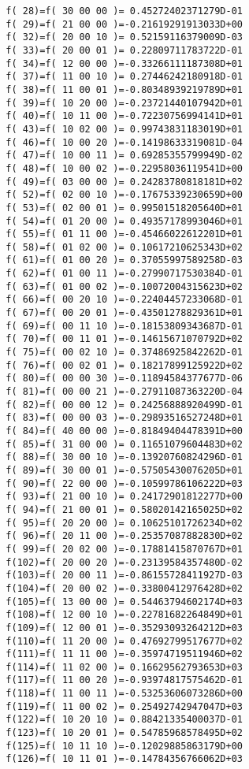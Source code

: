 {\begin{verbatim}
  f( 28)=f( 30 00 00 )= 0.45272402371279D-01
  f( 29)=f( 21 00 00 )=-0.21619291913033D+00
  f( 32)=f( 20 00 10 )= 0.52159116379009D-03
  f( 33)=f( 20 00 01 )= 0.22809711783722D-01
  f( 34)=f( 12 00 00 )=-0.33266111187308D+01
  f( 37)=f( 11 00 10 )= 0.27446242180918D-01
  f( 38)=f( 11 00 01 )=-0.80348939219789D+01
  f( 39)=f( 10 20 00 )=-0.23721440107942D+01
  f( 40)=f( 10 11 00 )=-0.72230756994141D+01
  f( 43)=f( 10 02 00 )= 0.99743831183019D+01
  f( 46)=f( 10 00 20 )=-0.14198633319081D-04
  f( 47)=f( 10 00 11 )= 0.69285355799949D-02
  f( 48)=f( 10 00 02 )=-0.22958036119541D+00
  f( 49)=f( 03 00 00 )= 0.24283780818181D+02
  f( 52)=f( 02 00 10 )=-0.17675339230659D+00
  f( 53)=f( 02 00 01 )= 0.99501518205640D+01
  f( 54)=f( 01 20 00 )= 0.49357178993046D+01
  f( 55)=f( 01 11 00 )=-0.45466022612201D+01
  f( 58)=f( 01 02 00 )= 0.10617210625343D+02
  f( 61)=f( 01 00 20 )= 0.37055997589258D-03
  f( 62)=f( 01 00 11 )=-0.27990717530384D-01
  f( 63)=f( 01 00 02 )=-0.10072004315623D+02
  f( 66)=f( 00 20 10 )=-0.22404457233068D-01
  f( 67)=f( 00 20 01 )=-0.43501278829361D+01
  f( 69)=f( 00 11 10 )=-0.18153809343687D-01
  f( 70)=f( 00 11 01 )=-0.14615671070792D+02
  f( 75)=f( 00 02 10 )= 0.37486925842262D-01
  f( 76)=f( 00 02 01 )= 0.18217899125922D+02
  f( 80)=f( 00 00 30 )=-0.11894584377677D-06
  f( 81)=f( 00 00 21 )=-0.27911087363220D-04
  f( 82)=f( 00 00 12 )= 0.24256888920499D-01
  f( 83)=f( 00 00 03 )=-0.29893516527248D+01
  f( 84)=f( 40 00 00 )=-0.81849404478391D+00
  f( 85)=f( 31 00 00 )= 0.11651079604483D+02
  f( 88)=f( 30 00 10 )=-0.13920760824296D-01
  f( 89)=f( 30 00 01 )=-0.57505430076205D+01
  f( 90)=f( 22 00 00 )=-0.10599786106222D+03
  f( 93)=f( 21 00 10 )= 0.24172901812277D+00
  f( 94)=f( 21 00 01 )= 0.58020142165025D+02
  f( 95)=f( 20 20 00 )= 0.10625101726234D+02
  f( 96)=f( 20 11 00 )=-0.25357087882830D+02
  f( 99)=f( 20 02 00 )=-0.17881415870767D+01
  f(102)=f( 20 00 20 )=-0.23139584357480D-02
  f(103)=f( 20 00 11 )=-0.86155728411927D-03
  f(104)=f( 20 00 02 )=-0.33800412976428D+02
  f(105)=f( 13 00 00 )= 0.54463794602174D+03
  f(108)=f( 12 00 10 )=-0.22781682264849D+01
  f(109)=f( 12 00 01 )=-0.35293093264212D+03
  f(110)=f( 11 20 00 )= 0.47692799517677D+02
  f(111)=f( 11 11 00 )=-0.35974719511946D+02
  f(114)=f( 11 02 00 )= 0.16629562793653D+03
  f(117)=f( 11 00 20 )=-0.93974817575462D-01
  f(118)=f( 11 00 11 )=-0.53253606073286D+00
  f(119)=f( 11 00 02 )= 0.25492742947047D+03
  f(122)=f( 10 20 10 )= 0.88421335400037D-01
  f(123)=f( 10 20 01 )= 0.54785968578495D+02
  f(125)=f( 10 11 10 )=-0.12029885863179D+00
  f(126)=f( 10 11 01 )=-0.14784356766062D+03

\end{verbatim}}
